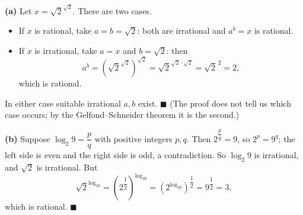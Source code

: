 \textbf{(a)} Let $x=\sqrt2^{\sqrt2}$. There are two cases.
\begin{itemize}
\item If $x$ is rational, take $a=b=\sqrt2$: both are irrational and $a^b=x$ is rational.
\item If $x$ is irrational, take $a=x$ and $b=\sqrt2$: then
\[
a^b=\left(\sqrt2^{\sqrt2}\right)^{\sqrt2}=\sqrt2^{\sqrt2\cdot\sqrt2}=\sqrt2^{\,2}=2,
\]
which is rational.
\end{itemize}
In either case suitable irrational $a,b$ exist. $\blacksquare$ (The proof does not tell us which case occurs; by the Gelfond--Schneider theorem it is the second.)

\textbf{(b)} Suppose $\log_2 9=\dfrac {p}{q}$ with positive integers $p,q$. Then $2^{\dfrac {p}{q}}=9$, so $2^p=9^q$; the left side is even and the right side is odd, a contradiction. So $\log_2 9$ is irrational, and $\sqrt2$ is irrational. But
\[
\sqrt2^{\log_29}=\left(2^{\dfrac{1}{2}}\right)^{\log_29}=\left(2^{\log_29}\right)^{\dfrac{1}{2}}=9^{\dfrac{1}{2}}=3,
\]
which is rational. $\blacksquare$
